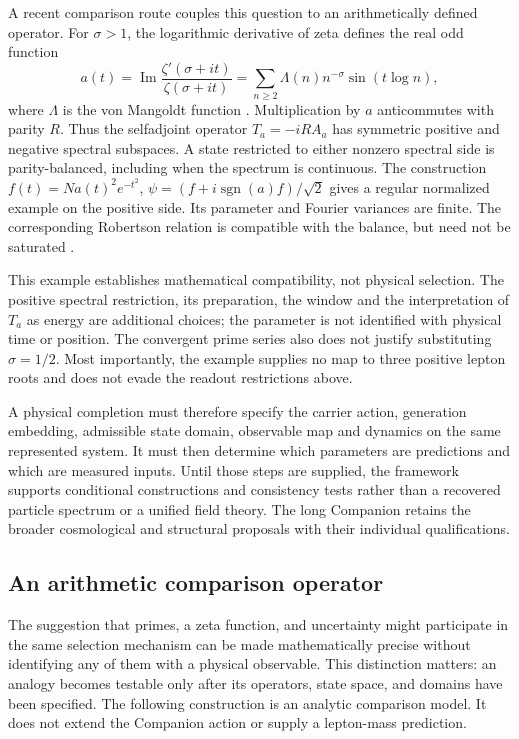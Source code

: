\documentclass[11pt,a4paper]{article}
\begin{document}
A recent comparison route couples this question to an arithmetically
defined operator. For $\sigma>1$, the logarithmic derivative of zeta
defines the real odd function
\begin{equation}
 a(t)=\operatorname{Im}\frac{\zeta'(\sigma+it)}{\zeta(\sigma+it)}
 =\sum_{n\geq2}\Lambda(n)n^{-\sigma}\sin(t\log n),
\end{equation}
where $\Lambda$ is the von Mangoldt function \cite{DLMF274}.
Multiplication by $a$ anticommutes with parity $R$. Thus the
selfadjoint operator $T_a=-iRA_a$ has symmetric positive and negative
spectral subspaces. A state restricted to either nonzero spectral side
is parity-balanced, including when the spectrum is continuous.
The construction $f(t)=Na(t)^2e^{-t^2}$,
$\psi=(f+i\operatorname{sgn}(a)f)/\sqrt2$ gives a regular normalized
example on the positive side. Its parameter and Fourier variances
are finite. The corresponding Robertson relation is compatible with
the balance, but need not be saturated \cite{Robertson1929}.

This example establishes mathematical compatibility, not physical
selection. The positive spectral restriction, its preparation, the
window and the interpretation of $T_a$ as energy are additional
choices; the parameter is not identified with physical time or position.
The convergent prime series also does not justify substituting
$\sigma=1/2$. Most importantly, the example supplies no map to three
positive lepton roots and does not evade the readout restrictions above.

A physical completion must therefore specify the carrier action,
generation embedding, admissible state domain, observable map and
dynamics on the same represented system. It must then determine which
parameters are predictions and which are measured inputs. Until those
steps are supplied, the framework supports conditional constructions
and consistency tests rather than a recovered particle spectrum or
a unified field theory. The long Companion retains the broader
cosmological and structural proposals with their individual qualifications.
\subsection{An arithmetic comparison operator}

The suggestion that primes, a zeta function, and uncertainty might
participate in the same selection mechanism can be made mathematically
precise without identifying any of them with a physical observable.
This distinction matters: an analogy becomes testable only after its
operators, state space, and domains have been specified. The following
construction is an analytic comparison model. It does not extend the
Companion action or supply a lepton-mass prediction.
\end{document}
